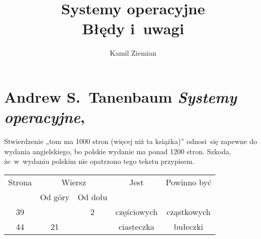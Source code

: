 \documentclass[a4paper,11pt]{article}
\title{Systemy operacyjne \\
  {\Large Błędy i~uwagi}}
\author{Kamil Ziemian}
\numberwithin{equation}{section}
\begin{document}





\maketitle





\section{Andrew S.~Tanenbaum \textit{Systemy operacyjne},
  \cite{TannenbaumSystemyOperacyjneWydanieIII2013}}

\label{sec:Tanenbaum-Systemy-operacyjne}




\noindent
{} Stwierdzenie „tom ma 1000 stron (więcej niż ta
książka)” odnosi~się zapewne do wydania angielskiego, bo polskie wydanie ma
ponad 1200 stron. Szkoda, że~w~wydaniu polskim nie opatrzono tego tekstu
przypisem.


\newpage



\begin{center}

  \begin{tabular}{|c|c|c|c|c|}
    \hline
    Strona & \multicolumn{2}{c|}{Wiersz} & Jest
    & Powinno być \\ \cline{2-3}
           & Od góry & Od dołu & & \\
    \hline
    39 & & \hphantom{0}2 & częściowych & cząstkowych \\
    44 & 21 & & ciasteczka & bułeczki \\
    \hline
  \end{tabular}

\end{center}
\end{document}
